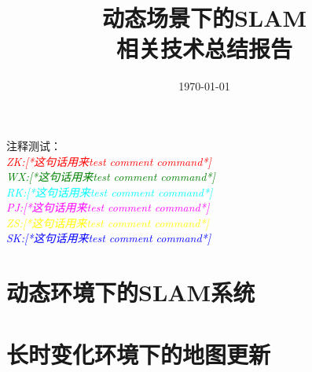 \documentclass[11pt,a4paper,UTF8]{zhalabReport}
\title{\fontsize{40}{60}\selectfont 动态场景下的SLAM\\相关技术总结报告}
\date{\chdate\today}
\def\authornote#1#2#3{{\textcolor{#2}{\textsl{\small#1:[*#3*]}}}}
\newcommand{\zknote}[1]{\authornote{ZK}{red}{#1}} %
\newcommand{\wxnote}[1]{\authornote{WX}{green}{#1}} %
\newcommand{\rknote}[1]{\authornote{RK}{cyan}{#1}} %
\newcommand{\pjnote}[1]{\authornote{PJ}{magenta}{#1}} %
\newcommand{\zsnote}[1]{\authornote{ZS}{yellow}{#1}} %
\newcommand{\sknote}[1]{\authornote{SK}{blue}{#1}} %
\newcommand{\zknote}[1]{}
\newcommand{\wxnote}[1]{}
\newcommand{\rknote}[1]{}
\newcommand{\pjnote}[1]{}
\newcommand{\zsnote}[1]{}
\newcommand{\sknote}[1]{}
\begin{document}

\maketitle

\tableofcontents
注释测试：\\
\zknote{这句话用来test comment command}\\
\wxnote{这句话用来test comment command}\\
\rknote{这句话用来test comment command}\\
\pjnote{这句话用来test comment command}\\
\zsnote{这句话用来test comment command}\\
\sknote{这句话用来test comment command}\\


\chapter{动态环境下的SLAM系统}



\label{sec:slam}



\chapter{长时变化环境下的地图更新}
\label{sec:mapping}



\cite{Dosovitskiy15cvpr}


	
\end{document}
